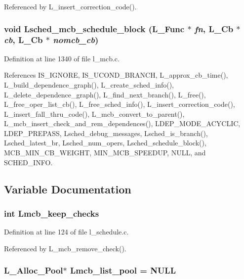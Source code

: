 Referenced by L\_\-insert\_\-correction\_\-code().
\subsubsection{\setlength{\rightskip}{0pt plus 5cm}void Lsched\_\-mcb\_\-schedule\_\-block (L\_\-Func $\ast$ {\em fn}, L\_\-Cb $\ast$ {\em cb}, L\_\-Cb $\ast$ {\em nomcb\_\-cb})}\label{l__mcb_8c_87c4a42bf87228adc317fe08e2aa57d1}




Definition at line 1340 of file l\_\-mcb.c.

References IS\_\-IGNORE, IS\_\-UCOND\_\-BRANCH, L\_\-approx\_\-cb\_\-time(), L\_\-build\_\-dependence\_\-graph(), L\_\-create\_\-sched\_\-info(), L\_\-delete\_\-dependence\_\-graph(), L\_\-find\_\-next\_\-branch(), L\_\-free(), L\_\-free\_\-oper\_\-list\_\-cb(), L\_\-free\_\-sched\_\-info(), L\_\-insert\_\-correction\_\-code(), L\_\-insert\_\-fall\_\-thru\_\-code(), L\_\-mcb\_\-convert\_\-to\_\-parent(), L\_\-mcb\_\-insert\_\-check\_\-and\_\-rem\_\-dependences(), LDEP\_\-MODE\_\-ACYCLIC, LDEP\_\-PREPASS, Lsched\_\-debug\_\-messages, Lsched\_\-is\_\-branch(), Lsched\_\-latest\_\-br, Lsched\_\-num\_\-opers, Lsched\_\-schedule\_\-block(), MCB\_\-MIN\_\-CB\_\-WEIGHT, MIN\_\-MCB\_\-SPEEDUP, NULL, and SCHED\_\-INFO.

\subsection{Variable Documentation}
\subsubsection{\setlength{\rightskip}{0pt plus 5cm}int \bf{Lmcb\_\-keep\_\-checks}}\label{l__mcb_8c_7fa8b9ab156b1588456d5055d2d2633f}




Definition at line 124 of file l\_\-schedule.c.

Referenced by L\_\-mcb\_\-remove\_\-check().
\subsubsection{\setlength{\rightskip}{0pt plus 5cm}\bf{L\_\-Alloc\_\-Pool}$\ast$ \bf{Lmcb\_\-list\_\-pool} = \bf{NULL}}\label{l__mcb_8c_f14f50cac6624f247009281f9fa796ab}




